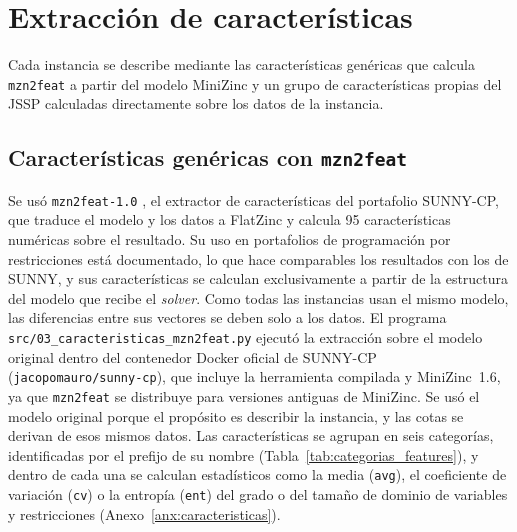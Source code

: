 \section{Extracción de características}
\label{sec:features}

Cada instancia se describe mediante las características genéricas que calcula
\texttt{mzn2feat} a partir del modelo MiniZinc y un grupo de características
propias del JSSP calculadas directamente sobre los datos de la instancia.

\subsection{Características genéricas con \texttt{mzn2feat}}

Se usó \texttt{mzn2feat-1.0} \citep{amadini2014mzn2feat, amadini2015sunnycp},
el extractor de
características del portafolio SUNNY-CP, que traduce el modelo y los datos a
FlatZinc y calcula 95 características numéricas sobre el resultado. Su uso en
portafolios de programación por restricciones está documentado, lo que hace
comparables los resultados con los de SUNNY, y sus características se calculan
exclusivamente a partir de la estructura del modelo que recibe el
\textit{solver}. Como todas las instancias usan el mismo modelo, las
diferencias entre sus vectores se deben solo a los datos. El programa
\texttt{src/03\_caracteristicas\_mzn2feat.py} ejecutó la extracción sobre el
modelo original dentro del contenedor Docker oficial de SUNNY-CP
(\texttt{jacopomauro/sunny-cp}), que incluye la herramienta compilada y
MiniZinc~1.6, ya que \texttt{mzn2feat} se distribuye para versiones antiguas
de MiniZinc. Se usó el modelo original porque el propósito es describir la
instancia, y las cotas se derivan de esos mismos datos. Las características se
agrupan en seis categorías, identificadas por el prefijo de su nombre
(Tabla~\ref{tab:categorias_features}), y dentro de cada una se calculan
estadísticos como la media (\texttt{avg}), el coeficiente de variación
(\texttt{cv}) o la entropía (\texttt{ent}) del grado o del tamaño de dominio
de variables y restricciones (Anexo~\ref{anx:caracteristicas}).

